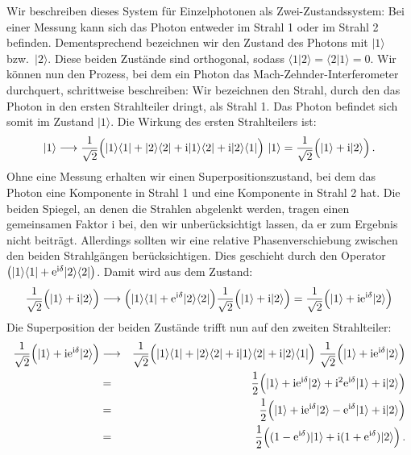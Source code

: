 Wir beschreiben dieses System f\"ur Einzelphotonen als Zwei-Zustandssystem: Bei einer Messung kann sich
das Photon entweder im Strahl 1 oder im Strahl 2 befinden. Dementsprechend bezeichnen wir den
Zustand des Photons mit $|1\rangle$ bzw.\ $|2\rangle$. Diese beiden Zust\"ande sind orthogonal, sodass
$\langle 1|2\rangle = \langle 2|1\rangle=0$. 
Wir k\"onnen nun den Prozess, bei dem
ein Photon das Mach-Zehnder-Interferometer durchquert, schrittweise beschreiben: Wir bezeichnen den
Strahl, durch den das Photon in den ersten Strahlteiler dringt, als
Strahl 1. Das Photon befindet sich somit im Zustand $|1\rangle$. Die
Wirkung des ersten Strahlteilers ist:
\begin{equation}
  |1\rangle \longrightarrow \frac{1}{\sqrt{2}} \Big(  | 1 \rangle \langle 1 | + | 2 \rangle \langle 2 | +
          {\rm i}  | 1 \rangle \langle 2 | + {\rm i} | 2 \rangle \langle 1 |  \Big)~ |1\rangle =
       \frac{1}{\sqrt{2}} \Big(  | 1 \rangle  + {\rm i} | 2 \rangle \Big) \, . 
\end{equation}
Ohne eine Messung erhalten wir einen Superpositionszustand, bei dem das Photon eine Komponente
in Strahl 1 und eine Komponente in Strahl 2 hat.
Die beiden Spiegel, an denen die Strahlen abgelenkt werden, tragen einen gemeinsamen Faktor
i bei, den wir unber\"ucksichtigt lassen, da er zum Ergebnis nicht beitr\"agt. 
Allerdings sollten wir eine relative Phasenverschiebung zwischen den beiden Strahlg\"angen 
ber\"ucksichtigen. Dies geschieht durch den Operator
$\big( |1\rangle \langle 1 | + {\rm e}^{{\rm i}\delta} |2\rangle \langle 2 | \big)$. Damit wird aus dem Zustand:
\begin{equation}
    \frac{1}{\sqrt{2}} \Big(  | 1 \rangle  + {\rm i} | 2 \rangle \Big)  \longrightarrow
     \Big( |1\rangle \langle 1 | + {\rm e}^{{\rm i}\delta} |2\rangle \langle 2 | \Big) 
      \frac{1}{\sqrt{2}} \Big(  | 1 \rangle  + {\rm i} | 2 \rangle \Big)  =   
      \frac{1}{\sqrt{2}} \Big(  | 1 \rangle  + {\rm i} {\rm e}^{{\rm i}\delta} | 2 \rangle \Big) 
\end{equation}
Die Superposition der beiden Zust\"ande
trifft nun auf den zweiten Strahlteiler:
\begin{eqnarray}
       \frac{1}{\sqrt{2}} \Big(  | 1 \rangle  + {\rm i} {\rm e}^{{\rm i}\delta} | 2 \rangle \Big) & \longrightarrow &
         \frac{1}{\sqrt{2}} \Big(  | 1 \rangle \langle 1 | + | 2 \rangle \langle 2 | +
          {\rm i}  | 1 \rangle \langle 2 | + {\rm i} | 2 \rangle \langle 1 |  \Big)~  \frac{1}{\sqrt{2}} 
          \Big(  | 1 \rangle  + {\rm i} {\rm e}^{{\rm i}\delta} | 2 \rangle \Big)  \\
         & = &  \frac{1}{2} \Big(  | 1 \rangle  + {\rm i} {\rm e}^{{\rm i}\delta} | 2 \rangle  
                        + {\rm i}^2 {\rm e}^{{\rm i}\delta} |1\rangle +{\rm i} |2\rangle \Big) \\
         &=&   \frac{1}{2} \Big(  | 1 \rangle  + {\rm i}{\rm e}^{{\rm i}\delta} | 2 \rangle  - {\rm e}^{{\rm i}\delta} |1\rangle +{\rm i} |2\rangle \Big) \\
         & = & \frac{1}{2} \Big( (1-{\rm e}^{{\rm i}\delta}) |  1 \rangle + {\rm i} (1 + {\rm e}^{{\rm i}\delta}) |2\rangle \Big)  \, . 
\end{eqnarray}
